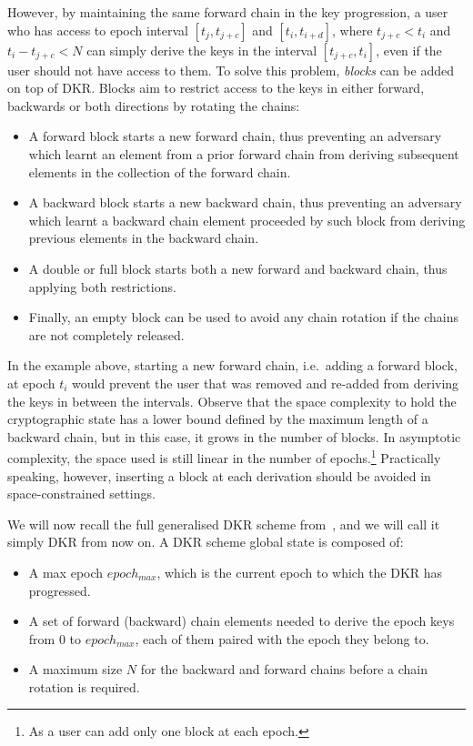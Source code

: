 However, by maintaining the same forward chain in the key progression,
a user who has access to epoch interval 
$[t_j, t_{j + c}]$ and $[t_i, t_{i + d}]$, 
where $t_{j + c} < t_i$ and $t_i - t_{j + c} < N$  
can simply derive the keys in the interval $[t_{j + c}, t_i]$, even if 
the user should not have access to them.
To solve this problem, \textit{blocks} can be added on top of DKR.
Blocks aim to restrict access to the keys in either forward, backwards
or both directions by rotating the chains:
\begin{itemize}
    \item A forward block starts a new forward chain, thus preventing an adversary which learnt an element from a prior forward chain from deriving subsequent elements in the collection of the forward chain. 
    \item A backward block starts a new backward chain, thus preventing an adversary which learnt a backward chain element proceeded by such block from deriving previous elements in the backward chain.
    \item A double or full block starts both a new forward and backward chain, thus applying both restrictions.
    \item Finally, an empty block can be used to avoid any chain rotation if the chains are not completely released.
\end{itemize} 
In the example above, starting a new forward chain, i.e.\ adding a forward block,
at epoch $t_i$ would prevent the user that was removed and re-added from deriving the keys in between 
the intervals. Observe that the space complexity to hold the cryptographic
state has a lower bound defined by the maximum length of a backward chain,
but in this case, it grows in the number of blocks. In asymptotic
complexity, the space used is still linear in the number of epochs.\footnote{As a user can add only one block at each epoch.}
Practically speaking, however, inserting a block at each derivation
should be avoided in space-constrained settings.


We will now recall the full generalised DKR scheme from~\cite{GKP}, and we will call it simply DKR from now on. 
A DKR scheme global state is composed of:
\begin{itemize}
    \item A max epoch $epoch_{max}$, which is the current epoch to which the DKR has progressed.
    \item A set of forward (backward) chain elements needed to derive the epoch keys from 0 to $epoch_{max}$, each of them paired with the epoch they belong to.
    \item A maximum size $N$ for the backward and forward chains before a chain rotation is required.
\end{itemize}

